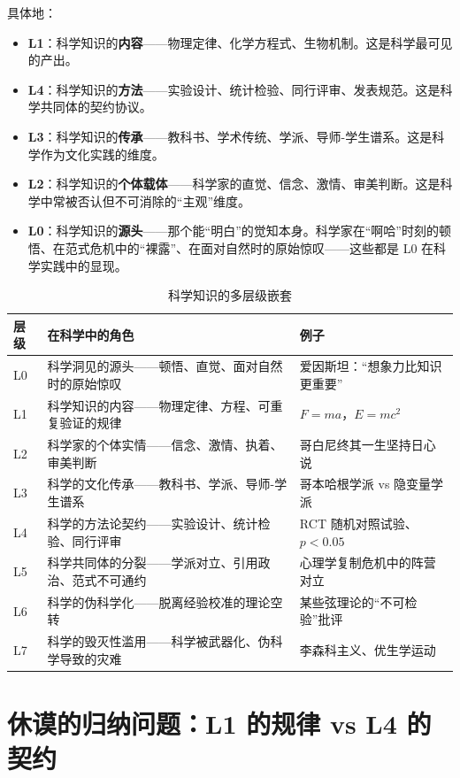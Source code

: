 \documentclass[UTF8,12pt,a4paper]{ctexart}
\begin{document}
具体地：
\begin{itemize}[nosep]
    \item \textbf{L1}：科学知识的\textbf{内容}——物理定律、化学方程式、生物机制。这是科学最可见的产出。
    \item \textbf{L4}：科学知识的\textbf{方法}——实验设计、统计检验、同行评审、发表规范。这是科学共同体的契约协议。
    \item \textbf{L3}：科学知识的\textbf{传承}——教科书、学术传统、学派、导师-学生谱系。这是科学作为文化实践的维度。
    \item \textbf{L2}：科学知识的\textbf{个体载体}——科学家的直觉、信念、激情、审美判断。这是科学中常被否认但不可消除的``主观''维度。
    \item \textbf{L0}：科学知识的\textbf{源头}——那个能``明白''的觉知本身。科学家在``啊哈''时刻的顿悟、在范式危机中的``裸露''、在面对自然时的原始惊叹——这些都是 L0 在科学实践中的显现。
\end{itemize}

\begin{table}[h]
\centering
\caption{科学知识的多层级嵌套}
\begin{tabular}{p{1.2cm}p{4cm}p{7cm}}
\toprule
\textbf{层级} & \textbf{在科学中的角色} & \textbf{例子} \\
\midrule
L0 & 科学洞见的源头——顿悟、直觉、面对自然时的原始惊叹 & 爱因斯坦：``想象力比知识更重要'' \\
L1 & 科学知识的内容——物理定律、方程、可重复验证的规律 & $F = ma$，$E = mc^2$ \\
L2 & 科学家的个体实情——信念、激情、执着、审美判断 & 哥白尼终其一生坚持日心说 \\
L3 & 科学的文化传承——教科书、学派、导师-学生谱系 & 哥本哈根学派 vs 隐变量学派 \\
L4 & 科学的方法论契约——实验设计、统计检验、同行评审 & RCT 随机对照试验、$p < 0.05$ \\
L5 & 科学共同体的分裂——学派对立、引用政治、范式不可通约 & 心理学复制危机中的阵营对立 \\
L6 & 科学的伪科学化——脱离经验校准的理论空转 & 某些弦理论的``不可检验''批评 \\
L7 & 科学的毁灭性滥用——科学被武器化、伪科学导致的灾难 & 李森科主义、优生学运动 \\
\bottomrule
\end{tabular}
\end{table}

\section{休谟的归纳问题：L1 的规律 vs L4 的契约}
\end{document}
